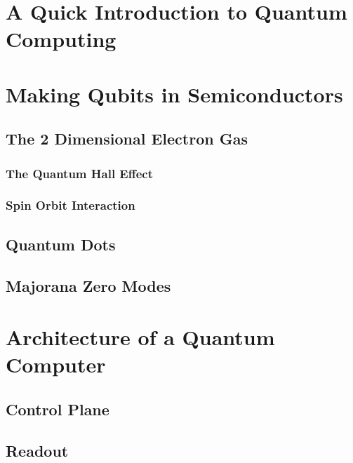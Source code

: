 \section{A Quick Introduction to Quantum Computing}
\label{sec:qc}

\section{Making Qubits in Semiconductors}
\label{sec:qcinsm}
  \subsection{The 2 Dimensional Electron Gas}
  \subsubsection{The Quantum Hall Effect}
  \subsubsection{Spin Orbit Interaction}
  \subsection{Quantum Dots}
  \subsection{Majorana Zero Modes}

\section{Architecture of a Quantum Computer}
\label{sec:arch}
  \subsection{Control Plane}
  \subsection{Readout}